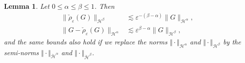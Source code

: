 \documentclass[a4paper, reqno, 12pt]{amsart}
\theoremstyle{plain}
\newtheorem{lemma}[definition]{Lemma}
\theoremstyle{definition}
\begin{document}
\begin{lemma}
\label{lem:rhoregularity}
    Let $0\leq \alpha \leq \beta \leq 1$. Then
    \begin{align}
    \label{eq:rhobounded} 
        \|\check\rho_\varepsilon(G)\|_{\mathcal H^{\beta}} &\lesssim \varepsilon^{-(\beta-\alpha)} \|G\|_{\mathcal H^{\alpha}},\\
        \label{eq:rhoapprox}
        \|G-\check\rho_\varepsilon(G)\|_{\mathcal H^{\alpha}} &\lesssim \varepsilon^{\beta-\alpha} \|G\|_{\mathcal H^{\beta}},
    \end{align}
    and the same bounds also hold if we replace the norms $\Vert \cdot \Vert_{\mathcal H^{\alpha}}$ and $\Vert \cdot \Vert_{\mathcal H^{\beta}}$ by the semi-norms $\Vert \cdot \Vert_{\dot{\mathcal H}^{\alpha}}$ and $\Vert \cdot \Vert_{\dot{\mathcal H}^{\beta}}$.
\end{lemma}
\end{document}
